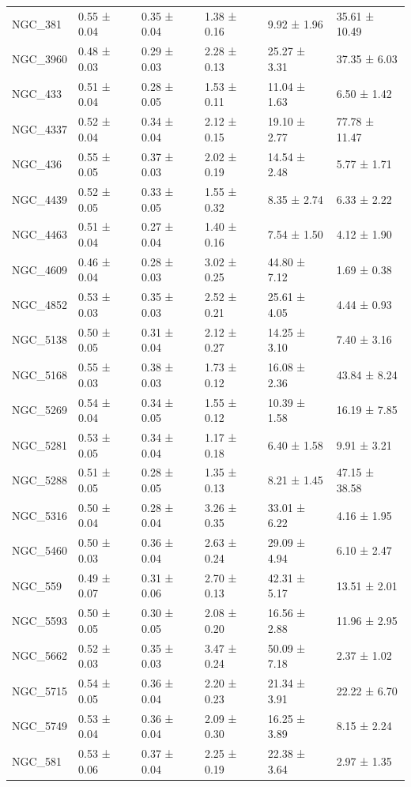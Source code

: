\begin{tabular}{llllll}
NGC_381 & 0.55 ± 0.04 & 0.35 ± 0.04 & 1.38 ± 0.16 & 9.92 ± 1.96 & 35.61 ± 10.49 \\
NGC_3960 & 0.48 ± 0.03 & 0.29 ± 0.03 & 2.28 ± 0.13 & 25.27 ± 3.31 & 37.35 ± 6.03 \\
NGC_433 & 0.51 ± 0.04 & 0.28 ± 0.05 & 1.53 ± 0.11 & 11.04 ± 1.63 & 6.50 ± 1.42 \\
NGC_4337 & 0.52 ± 0.04 & 0.34 ± 0.04 & 2.12 ± 0.15 & 19.10 ± 2.77 & 77.78 ± 11.47 \\
NGC_436 & 0.55 ± 0.05 & 0.37 ± 0.03 & 2.02 ± 0.19 & 14.54 ± 2.48 & 5.77 ± 1.71 \\
NGC_4439 & 0.52 ± 0.05 & 0.33 ± 0.05 & 1.55 ± 0.32 & 8.35 ± 2.74 & 6.33 ± 2.22 \\
NGC_4463 & 0.51 ± 0.04 & 0.27 ± 0.04 & 1.40 ± 0.16 & 7.54 ± 1.50 & 4.12 ± 1.90 \\
NGC_4609 & 0.46 ± 0.04 & 0.28 ± 0.03 & 3.02 ± 0.25 & 44.80 ± 7.12 & 1.69 ± 0.38 \\
NGC_4852 & 0.53 ± 0.03 & 0.35 ± 0.03 & 2.52 ± 0.21 & 25.61 ± 4.05 & 4.44 ± 0.93 \\
NGC_5138 & 0.50 ± 0.05 & 0.31 ± 0.04 & 2.12 ± 0.27 & 14.25 ± 3.10 & 7.40 ± 3.16 \\
NGC_5168 & 0.55 ± 0.03 & 0.38 ± 0.03 & 1.73 ± 0.12 & 16.08 ± 2.36 & 43.84 ± 8.24 \\
NGC_5269 & 0.54 ± 0.04 & 0.34 ± 0.05 & 1.55 ± 0.12 & 10.39 ± 1.58 & 16.19 ± 7.85 \\
NGC_5281 & 0.53 ± 0.05 & 0.34 ± 0.04 & 1.17 ± 0.18 & 6.40 ± 1.58 & 9.91 ± 3.21 \\
NGC_5288 & 0.51 ± 0.05 & 0.28 ± 0.05 & 1.35 ± 0.13 & 8.21 ± 1.45 & 47.15 ± 38.58 \\
NGC_5316 & 0.50 ± 0.04 & 0.28 ± 0.04 & 3.26 ± 0.35 & 33.01 ± 6.22 & 4.16 ± 1.95 \\
NGC_5460 & 0.50 ± 0.03 & 0.36 ± 0.04 & 2.63 ± 0.24 & 29.09 ± 4.94 & 6.10 ± 2.47 \\
NGC_559 & 0.49 ± 0.07 & 0.31 ± 0.06 & 2.70 ± 0.13 & 42.31 ± 5.17 & 13.51 ± 2.01 \\
NGC_5593 & 0.50 ± 0.05 & 0.30 ± 0.05 & 2.08 ± 0.20 & 16.56 ± 2.88 & 11.96 ± 2.95 \\
NGC_5662 & 0.52 ± 0.03 & 0.35 ± 0.03 & 3.47 ± 0.24 & 50.09 ± 7.18 & 2.37 ± 1.02 \\
NGC_5715 & 0.54 ± 0.05 & 0.36 ± 0.04 & 2.20 ± 0.23 & 21.34 ± 3.91 & 22.22 ± 6.70 \\
NGC_5749 & 0.53 ± 0.04 & 0.36 ± 0.04 & 2.09 ± 0.30 & 16.25 ± 3.89 & 8.15 ± 2.24 \\
NGC_581 & 0.53 ± 0.06 & 0.37 ± 0.04 & 2.25 ± 0.19 & 22.38 ± 3.64 & 2.97 ± 1.35 \\

\end{tabular}
